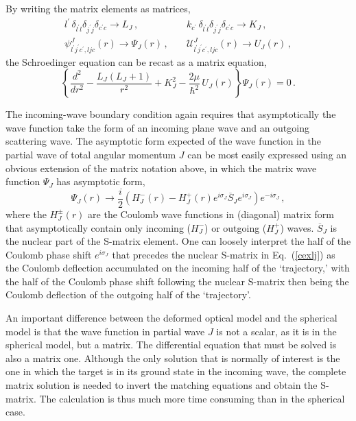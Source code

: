 \documentclass[twocolumn,amsmath,amssymb,10pt,groupedaddress,a4paper]{revtex4}
\begin{document}
By writing the matrix elements as matrices, \begin{eqnarray}
l^{\prime}\,\delta_{l^{\prime}l}\delta_{j^{\prime}j}\delta_{c^{\prime}c}\rightarrow L_{J}\,, & \; & k_{c^{\prime}}\,\delta_{l^{\prime}l}\delta_{j^{\prime}j}\delta_{c^{\prime}c}\rightarrow K_{J}\,,\\
\psi_{l^{\prime}j^{\prime}c^{\prime},ljc}^{J}(r)\rightarrow\Psi_{J}(r)\,, & \; & {\mathcal{U}}_{l^{\prime}j^{\prime}c^{\prime},ljc}^{J}(r)\rightarrow U_{J}(r)\,,\nonumber \end{eqnarray}
 the Schroedinger equation can be recast as
a matrix equation, \begin{equation}
\left\{ \frac{d^{2}}{dr^{2}}-\frac{L_{J}(L_{J}+1)}{r^{2}}+K_{J}^{2}-\frac{2\mu}{\hbar^{2}}\, U_{J}(r)\right\} \Psi_{J}(r)=0\,.\label{ceqj}\end{equation}

The incoming-wave boundary condition again requires that asymptotically
the wave function take the form of an incoming plane wave and an outgoing
scattering wave. The asymptotic form expected of the wave function in
the partial wave
of total angular momentum $J$ can be most easily expressed using
an obvious extension of the matrix notation above, in which the
matrix wave function $\Psi_{J}$ has asymptotic form,
\begin{equation}
\Psi_{J}(r)\rightarrow
 \frac{i}{2}\left(H_{J}^{-}(r)-H_{J}^{+}(r)e^{i\sigma_{J}}\overline{S}_{J}e^{i\sigma_{J}}\right)e^{-i\sigma_{J}}\,, \label{cexlj}\end{equation}
 where the $H_{J}^{\pm}(r)$
are the Coulomb wave functions in (diagonal)
matrix form that asymptotically contain only
incoming ($H_{J}^{-}$) or outgoing ($H_{J}^{+}$) waves. $\overline{S}_{J}$
is the nuclear part of the S-matrix element. One can loosely interpret
the half of the Coulomb phase shift $e^{i\sigma_{J}}$ that precedes
the nuclear S-matrix in Eq.~(\ref{cexlj}) as the Coulomb deflection
accumulated on the incoming half of the `trajectory,' with the half
of the Coulomb phase shift following the nuclear S-matrix then being
the Coulomb deflection of the outgoing half of the `trajectory'.

An important difference between the deformed optical model and the
spherical model is that the wave function in partial wave $J$ is
not a scalar, as it is in the spherical model, but a matrix. The differential
equation that must be solved is also a matrix one. Although the only
solution that is normally of interest is the one in which the target
is in its ground state in the incoming wave, the complete matrix solution
is needed to invert the matching equations and obtain the S-matrix.
The calculation is thus much more time consuming than in the spherical
case.
\end{document}

